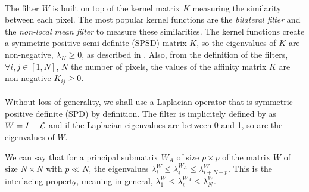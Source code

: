 \paragraph{}
The filter \(W\) is built on top of the kernel matrix \(K\) measuring the similarity between each pixel.
The most popular kernel functions are the \textit{bilateral filter} \cite{bilateral_tomasi_1998} and the \textit{non-local mean filter} \cite{kervrann_nlm_2006} to measure these similarities.
The kernel functions create a symmetric positive semi-definite (SPSD) matrix \(K\), so the eigenvalues of \(K\) are non-negative, \(\lambda_K \ge 0\), as described in \cite{talebi_fast_2016}.
Also, from the definition of the filters, \(\forall i, j \in [1, N]\), \(N\) the number of pixels, the values of the affinity matrix \(K\) are non-negative \(K_{ij} \ge 0\).

\paragraph{}
Without loss of generality, we shall use a Laplacian operator that is symmetric positive definite (SPD) by definition.
The filter is implicitely defined by \cite{modern_tour_2013} as \(W = I - \operatorname{\mathcal{L}}\) and if the Laplacian eigenvalues are between 0 and 1, so are the eigenvalues of \(W\).

We can say that for a principal submatrix \(W_A\) of size \(p \times p\) of the matrix \(W\) of size \(N \times N\) with \(p \ll N\), the eigenvalues \(\lambda^W_i \le \lambda^{W_A}_i \le \lambda^W_{i+N-p}\).
This is the interlacing property, meaning in general, \(\lambda^W_1 \le \lambda^{W_A}_i \le \lambda^W_N\).

